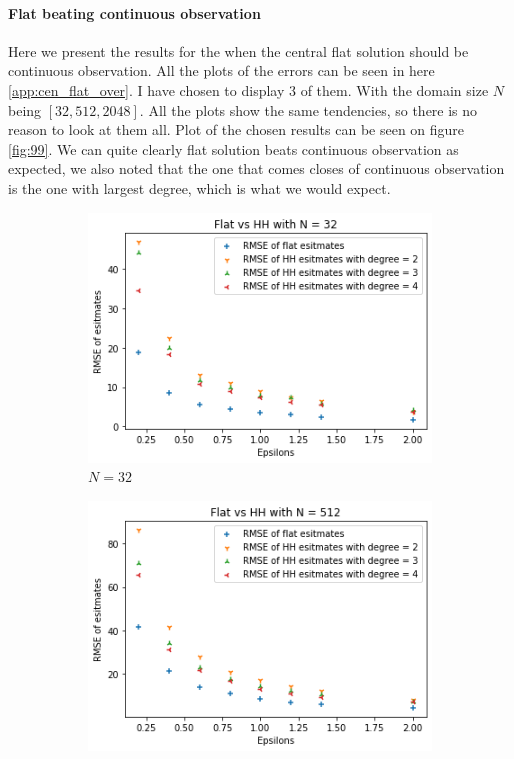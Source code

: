 \documentclass[11pt]{article}
\theoremstyle{definition}
\begin{document}
\paragraph{Flat beating continuous observation}
Here we present the results for the when the central flat solution should be continuous observation. All the plots of the errors can be seen in here \ref{app:cen_flat_over}. I have chosen to display 3 of them. With the domain size $N$ being $[32,512,2048]$. All the plots show the same tendencies, so there is no reason to look at them all. Plot of the chosen results can be seen on figure \ref{fig:99}. We can quite clearly flat solution beats continuous observation as expected, we also noted that the one that comes closes of continuous observation is the one with largest degree, which is what we would expect.
\begin{figure}[H]
\centering
\begin{subfigure}{.3\textwidth}
  \centering
  \includegraphics[width=\linewidth]{figures/central_flat_hh/flat_beat_hh_N=32.png}
  \caption{$N=32$}
  \label{96}
\end{subfigure}%
\begin{subfigure}{.3\textwidth}
  \centering
  \includegraphics[width=\linewidth]{figures/central_flat_hh/flat_beat_hh_N=512.png}

\end{subfigure}
\end{figure}
\end{document}
